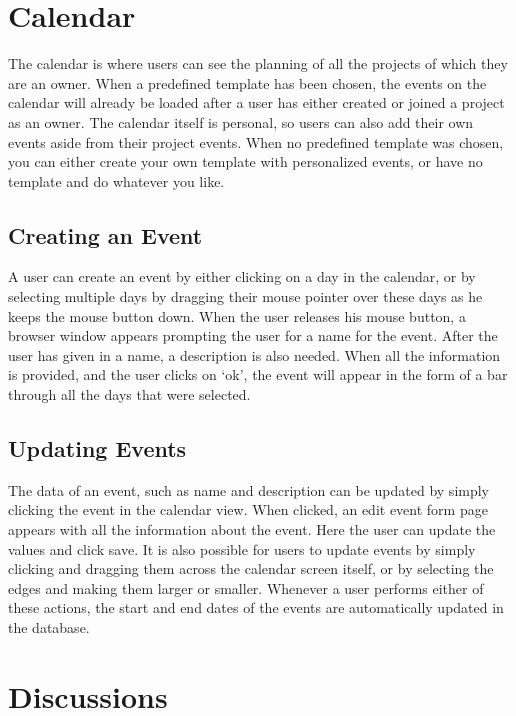\section{Calendar}

The calendar is where users can see the planning of all the projects of which they are an owner.
When a predefined template has been chosen, the events on the calendar will already be loaded after
a user has either created or joined a project as an owner. The calendar itself is personal, so users can also add their own events aside from their 
project events. When no predefined template was chosen, you can either
create your own template with personalized events, or have no template and do whatever you like.

\subsection{Creating an Event}

A user can create an event by either clicking on a day in the calendar, or by selecting multiple days by dragging their mouse pointer over these days
as he keeps the mouse button down. When the user releases his mouse button, a browser window appears prompting the user for a name for the event. After
the user has given in a name, a description is also needed. When all the information is provided, and the user clicks on `ok', the event will appear
in the form of a bar through all the days that were selected.

\subsection{Updating Events}

The data of an event, such as name and description can be updated by simply clicking the event in the calendar view. When clicked, an edit event 
form page appears with all the information about the event. Here the user can update the values and click save. It is also possible for users
to update events by simply clicking and dragging them across the calendar screen itself, or by selecting the edges and making them larger or
smaller. Whenever a user performs either of these actions, the start and end dates of the events are automatically updated in the database.
\newpage
\section{Discussions}

